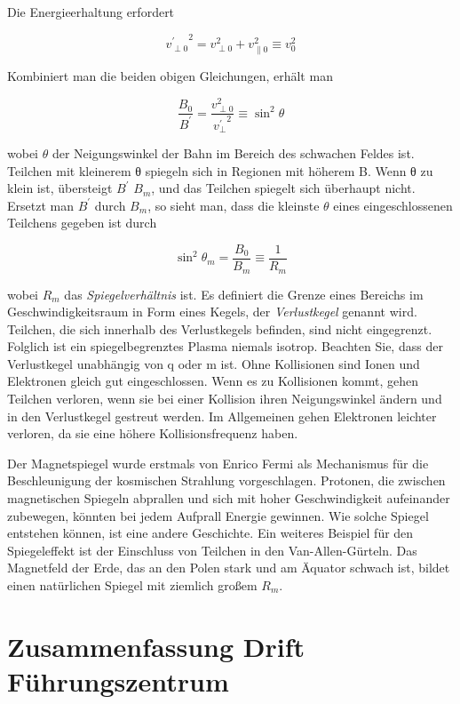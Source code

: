 \documentclass[
  a4paper,
  DIV=11]{scrreprt}
\begin{document}
Die Energieerhaltung erfordert

\[
{v_{\perp 0}^{\prime}}^2 = v_{\perp 0}^2 + v_{\parallel 0}^2 \equiv v_0^2
\]

Kombiniert man die beiden obigen Gleichungen, erhält man

\[
\frac{B_0}{B^\prime} = \frac{v_{\perp 0}^2}{{v_{\perp}^{\prime}}^2} \equiv \sin^2 \theta
\]

wobei \(\theta\) der Neigungswinkel der Bahn im Bereich des schwachen
Feldes ist. Teilchen mit kleinerem θ spiegeln sich in Regionen mit
höherem B. Wenn θ zu klein ist, übersteigt \(B^\prime\) \(B_m\), und das
Teilchen spiegelt sich überhaupt nicht. Ersetzt man \(B^\prime\) durch
\(B_m\), so sieht man, dass die kleinste \(\theta\) eines
eingeschlossenen Teilchens gegeben ist durch

\[
\sin^2 \theta_m = \frac{B_0}{B_m} \equiv \frac{1}{R_m}
\]

wobei \(R_m\) das \emph{Spiegelverhältnis} ist. Es definiert die Grenze
eines Bereichs im Geschwindigkeitsraum in Form eines Kegels, der
\emph{Verlustkegel} genannt wird. Teilchen, die sich innerhalb des
Verlustkegels befinden, sind nicht eingegrenzt. Folglich ist ein
spiegelbegrenztes Plasma niemals isotrop. Beachten Sie, dass der
Verlustkegel unabhängig von q oder m ist. Ohne Kollisionen sind Ionen
und Elektronen gleich gut eingeschlossen. Wenn es zu Kollisionen kommt,
gehen Teilchen verloren, wenn sie bei einer Kollision ihren
Neigungswinkel ändern und in den Verlustkegel gestreut werden. Im
Allgemeinen gehen Elektronen leichter verloren, da sie eine höhere
Kollisionsfrequenz haben.

Der Magnetspiegel wurde erstmals von Enrico Fermi als Mechanismus für
die Beschleunigung der kosmischen Strahlung vorgeschlagen. Protonen, die
zwischen magnetischen Spiegeln abprallen und sich mit hoher
Geschwindigkeit aufeinander zubewegen, könnten bei jedem Aufprall
Energie gewinnen. Wie solche Spiegel entstehen können, ist eine andere
Geschichte. Ein weiteres Beispiel für den Spiegeleffekt ist der
Einschluss von Teilchen in den Van-Allen-Gürteln. Das Magnetfeld der
Erde, das an den Polen stark und am Äquator schwach ist, bildet einen
natürlichen Spiegel mit ziemlich großem \(R_m\).

\hypertarget{zusammenfassung-drift-fuxfchrungszentrum}{%
\section{Zusammenfassung Drift
Führungszentrum}\label{zusammenfassung-drift-fuxfchrungszentrum}}
\end{document}

